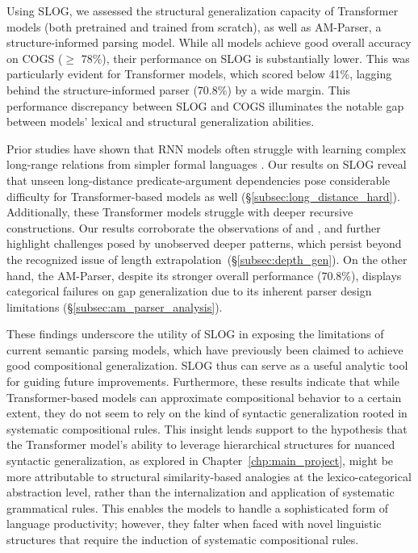 Using SLOG, we assessed the structural generalization capacity of Transformer models (both pretrained and trained from scratch), as well as AM-Parser, a structure-informed parsing model. While all models achieve good overall accuracy on COGS ($\geq$ 78\%), their performance on SLOG is substantially lower. This was particularly evident for Transformer models, which scored below 41\%, lagging behind the structure-informed parser (70.8\%) by a wide margin. This performance discrepancy between SLOG and COGS illuminates the notable gap between models' lexical and structural generalization abilities. 

Prior studies have shown that RNN models often struggle with learning complex long-range relations from simpler formal languages \citep{avcu2017subregular, mahalunkar-kelleher-2019-multi}. Our results on SLOG reveal that unseen long-distance predicate-argument dependencies pose considerable difficulty for Transformer-based models as well (\S\ref{subsec:long_distance_hard}). 
Additionally, these Transformer models struggle with deeper recursive constructions. Our results corroborate the observations of \cite{hupkes2020compositionality} and \cite{lakretz2021can}, and further highlight challenges posed by unobserved deeper patterns, which persist beyond the recognized issue of length extrapolation~(\S\ref{subsec:depth_gen}). On the other hand, the AM-Parser, despite its stronger overall performance (70.8\%), displays categorical failures on gap generalization due to its inherent parser design limitations (\S\ref{subsec:am_parser_analysis}). 

These findings underscore the utility of SLOG in exposing the limitations of current semantic parsing models, which have previously been claimed to achieve good compositional generalization. SLOG thus can serve as a useful analytic tool for guiding future improvements. Furthermore, these results indicate that while Transformer-based models can approximate compositional behavior to a certain extent, they do not seem to rely on the kind of syntactic generalization rooted in systematic compositional rules. This insight lends support to the hypothesis that the Transformer model's ability to leverage hierarchical structures for nuanced syntactic generalization, as explored in Chapter~\ref{chp:main_project}, might be more attributable to structural similarity-based analogies at the lexico-categorical abstraction level, rather than the internalization and application of systematic grammatical rules. This enables the models to handle a sophisticated form of language productivity; however, they falter when faced with novel linguistic structures that require the induction of systematic compositional rules.


